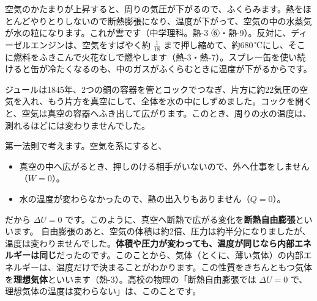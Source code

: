 \begin{phmijika}
空気のかたまりが上昇すると、周りの気圧が下がるので、ふくらみます。熱をほとんどやりとりしないので断熱膨張になり、温度が下がって、空気の中の水蒸気が水の粒になります。これが雲です（中学理科。熱-3 ⑥・熱-9）。反対に、ディーゼルエンジンは、空気をすばやく約 $\tfrac{1}{18}$ まで押し縮めて、約680\,℃にし、そこに燃料をふきこんで火花なしで燃やします（熱-3・熱-7）。スプレー缶を使い続けると缶が冷たくなるのも、中のガスがふくらむときに温度が下がるからです。
\end{phmijika}

\label{ph:熱-2:sec6}
\noindent\begin{minipage}[c]{0.44\linewidth}\centering
{}
\end{minipage}\hfill
\begin{minipage}[c]{0.53\linewidth}\raggedright
ジュールは1845年、2つの銅の容器を管とコックでつなぎ、片方に約22気圧の空気を入れ、もう片方を真空にして、全体を水の中にしずめました。コックを開くと、空気は真空の容器へふき出して広がります。このとき、周りの水の温度は、測れるほどには変わりませんでした。
\end{minipage}

\par\vspace{4pt}
第一法則で考えます。空気を系にすると、
\begin{itemize}[leftmargin=1.6\zw, itemsep=0pt, topsep=2pt]
\item 真空の中へ広がるとき、押しのける相手がいないので、外へ仕事をしません（$W=0$）。
\item 水の温度が変わらなかったので、熱の出入りもありません（$Q=0$）。
\end{itemize}
だから $\Delta U=0$ です。このように、真空へ断熱で広がる変化を\textbf{断熱自由膨張}といいます。
\label{ph:熱-2:jiyuu}自由膨張のあと、空気の体積は約2倍、圧力は約半分になりましたが、温度は変わりませんでした。\textbf{体積や圧力が変わっても、温度が同じなら内部エネルギーは同じ}だったのです。このことから、気体（とくに、薄い気体）の内部エネルギーは、温度だけで決まることがわかります。この性質をきちんともつ気体を\textbf{理想気体}といいます（熱-3）。高校の物理の「断熱自由膨張では $\Delta U=0$ で、理想気体の温度は変わらない」は、このことです。

